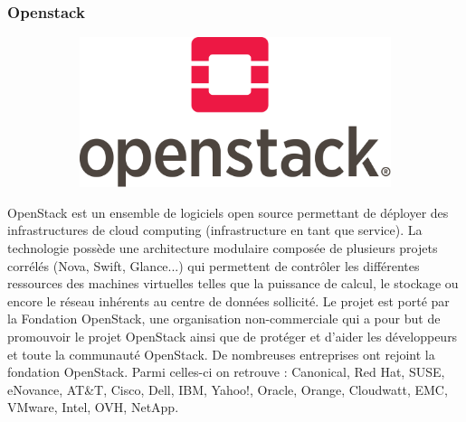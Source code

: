 \documentclass{article}
\begin{document}
\subsubsection{Openstack}

\begin{figure}[h!]
	\centering
  	\begin{subfigure}[b]{0.4\linewidth}
    \includegraphics[width=\linewidth]{open.png}
  	\end{subfigure}
\end{figure}

OpenStack est un ensemble de logiciels open source permettant de déployer des infrastructures de cloud computing (infrastructure en tant que service). La technologie possède une architecture modulaire composée de plusieurs projets corrélés (Nova, Swift, Glance...) qui permettent de contrôler les différentes ressources des machines virtuelles telles que la puissance de calcul, le stockage ou encore le réseau inhérents au centre de données sollicité.
\newline
Le projet est porté par la Fondation OpenStack, une organisation non-commerciale qui a pour but de promouvoir le projet OpenStack ainsi que de protéger et d'aider les développeurs et toute la communauté OpenStack.
\newline
De nombreuses entreprises ont rejoint la fondation OpenStack. Parmi celles-ci on retrouve : Canonical, Red Hat, SUSE, eNovance, AT\&T, Cisco, Dell, IBM, Yahoo!, Oracle, Orange, Cloudwatt, EMC, VMware, Intel, OVH, NetApp. 
\end{document}

